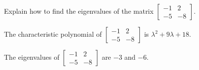 
\begin{exerciseStatement}


Explain how to find the eigenvalues of the matrix \( \left[\begin{array}{cc}
-1 & 2 \\
-5 & -8
\end{array}\right] \).


\end{exerciseStatement}
    
\begin{exerciseAnswer} 


The characteristic polynomial of \( \left[\begin{array}{cc}
-1 & 2 \\
-5 & -8
\end{array}\right] \) is \( \lambda^{2} + 9 \lambda + 18 \).



The eigenvalues of \( \left[\begin{array}{cc}
-1 & 2 \\
-5 & -8
\end{array}\right] \) are \( -3 \) and \( -6 \).


\end{exerciseAnswer}
    
